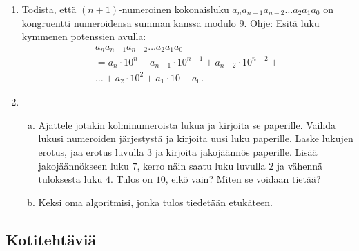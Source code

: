 \begin{enumerate}
\item
Todista, että $(n+1)$-numeroinen kokonaisluku $a_na_{n-1}a_{n-2}\ldots a_2a_1a_0$ on kongruentti numeroidensa summan kanssa modulo 9. Ohje: Esitä luku kymmenen potenssien avulla:
\begin{multline*}
a_na_{n-1}a_{n-2}\ldots a_2a_1a_0\\ = a_n \cdot 10^n + a_{n-1}\cdot 10^{n-1} + a_{n-2} \cdot 10^{n-2} + \\
\ldots + a_2 \cdot 10^2 + a_1 \cdot 10 + a_0.
\end{multline*}

\item
\begin{enumerate}[a)]
\item Ajattele jotakin kolminumeroista lukua ja kirjoita se paperille. Vaihda lukusi numeroiden järjestystä ja kirjoita uusi luku paperille. Laske lukujen erotus, jaa erotus luvulla $3$ ja kirjoita jakojäännös paperille. Lisää jakojäännökseen luku $7$, kerro näin saatu luku luvulla $2$ ja vähennä tuloksesta luku $4$. Tulos on $10$, eikö vain? Miten se voidaan tietää?
\item Keksi oma algoritmisi, jonka tulos tiedetään etukäteen.
\end{enumerate}

\end{enumerate}

\subsection*{Kotitehtäviä}

